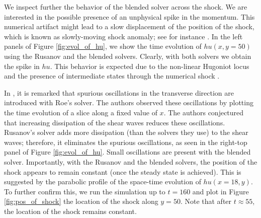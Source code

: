 \documentclass[preprint, 11pt]{article}
\begin{document}
{\color{OliveGreen}
  We inspect further the behavior of the blended solver across the shock. 
  We are interested in the possible presence of an unphysical spike in the momentum.
  This numerical artifact might lead to a slow displacement of the position of the shock,
  which is known as slowly-moving shock anomaly; see for instance \cite{navas2019improved, zaide2012numerical}.
  In the left panels of Figure \ref{fig:evol_of_hu}, we show the time evolution of $hu(x,y=50)$ using the Rusanov and the blended solvers.
  Clearly, with both solvers we obtain the spike in $hu$. This behavior is expected due to the non-linear Hugoniot locus
  and the presence of intermediate states through the numerical shock \cite[Section 4.1]{navas2019improved}.
  
  In \cite{navas2019improved}, it is remarked that spurious oscillations in the transverse direction are introduced with Roe's solver.
  The authors observed these oscillations by plotting the time evolution of a slice along a fixed value of $x$.
  The authors conjectured that increasing dissipation of the shear waves reduces these oscillations.
  Rusanov's solver adds more dissipation (than the solvers they use) to the shear waves; therefore,
  it eliminates the spurious oscillations,
  as seen in the right-top panel of Figure \ref{fig:evol_of_hu}. Small oscillations are present with the blended solver.
  Importantly, with the Rusanov and the blended solvers, the position of the shock appears to remain constant
  (once the steady state is achieved). This is suggested by the parabolic profile of the space-time evolution of $hu(x=18,y)$.
  To further confirm this, we run the simulation up to $t=160$ and plot in Figure \ref{fig:pos_of_shock} the location of the shock along $y=50$.
  Note that after $t\approx 55$, the location of the shock remains constant.
  
}
\end{document}

